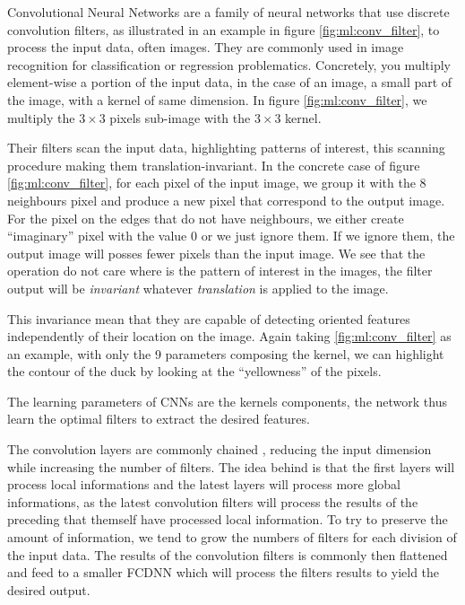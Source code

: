 \documentclass[../main.tex]{subfiles}
\begin{document}
Convolutional Neural Networks are a family of neural networks that use discrete convolution filters, as illustrated in an example in figure \ref{fig:ml:conv_filter}, to process the input data, often images. They are commonly used in image recognition \cite{russakovsky_imagenet_2015} for classification or regression problematics. Concretely, you multiply element-wise a portion of the input data, in the case of an image, a small part of the image, with a kernel of same dimension. In figure \ref{fig:ml:conv_filter}, we multiply the $3\times3$ pixels sub-image with the $3\times3$ kernel.

Their filters scan the input data, highlighting patterns of interest, this scanning procedure making them translation-invariant. In the concrete case of figure \ref{fig:ml:conv_filter}, for each pixel of the input image, we group it with the 8 neighbours pixel and produce a new pixel that correspond to the output image. For the pixel on the edges that do not have neighbours, we either create ``imaginary'' pixel with the value 0 or we just ignore them. If we ignore them, the output image will posses fewer pixels than the input image. We see that the operation do not care where is the pattern of interest in the images, the filter output will be \textit{invariant} whatever \textit{translation} is applied to the image.

This invariance mean that they are capable of detecting oriented features independently of their location on the image. Again taking \ref{fig:ml:conv_filter} as an example, with only the 9 parameters composing the kernel, we can highlight the contour of the duck by looking at the ``yellowness'' of the pixels.

The learning parameters of CNNs are the kernels components, the network thus learn the optimal filters to extract the desired features.

The convolution layers are commonly chained \cite{simonyan_very_2015}, reducing the input dimension while increasing the number of filters. The idea behind is that the first layers will process local informations and the latest layers will process more global informations, as the latest convolution filters will process the results of the preceding that themself have processed local information. To try to preserve the amount of information, we tend to grow the numbers of filters for each division of the input data.
The results of the convolution filters is commonly then flattened and feed to a smaller FCDNN which will process the filters results to yield the desired output.
\end{document}
